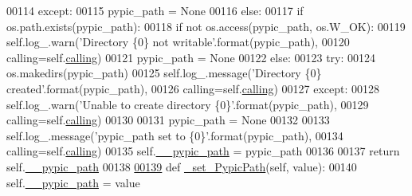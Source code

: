 \begin{DoxyCode}
00114                     \textcolor{keywordflow}{except}:
00115                         pypic\_path = \textcolor{keywordtype}{None}
00116         \textcolor{keywordflow}{else}:
00117             \textcolor{keywordflow}{if} os.path.exists(pypic\_path):
00118                 \textcolor{keywordflow}{if} \textcolor{keywordflow}{not} os.access(pypic\_path, os.W\_OK):
00119                     self.log\_.warn(\textcolor{stringliteral}{'Directory \{0\} not writable'}.format(pypic\_path),
00120                                       calling=self.\hyperlink{classpyneb_1_1utils_1_1_config_1_1___config_abf04542e5670abea107260ca7a6baf6d}{calling})
00121                     pypic\_path = \textcolor{keywordtype}{None}
00122             \textcolor{keywordflow}{else}:
00123                 \textcolor{keywordflow}{try}:
00124                     os.makedirs(pypic\_path)
00125                     self.log\_.message(\textcolor{stringliteral}{'Directory \{0\} created'}.format(pypic\_path),
00126                                       calling=self.\hyperlink{classpyneb_1_1utils_1_1_config_1_1___config_abf04542e5670abea107260ca7a6baf6d}{calling})
00127                 \textcolor{keywordflow}{except}:
00128                     self.log\_.warn(\textcolor{stringliteral}{'Unable to create directory \{0\}'}.format(pypic\_path),
00129                                       calling=self.\hyperlink{classpyneb_1_1utils_1_1_config_1_1___config_abf04542e5670abea107260ca7a6baf6d}{calling})
00130                     
00131                     pypic\_path = \textcolor{keywordtype}{None}
00132             
00133         self.log\_.message(\textcolor{stringliteral}{'pypic\_path set to \{0\}'}.format(pypic\_path),
00134                                           calling=self.\hyperlink{classpyneb_1_1utils_1_1_config_1_1___config_abf04542e5670abea107260ca7a6baf6d}{calling})
00135         self.\hyperlink{classpyneb_1_1utils_1_1_config_1_1___config_a1c122165aa8885ce11f9bf86d08c40cd}{\_\_pypic\_path} = pypic\_path
00136         
00137         \textcolor{keywordflow}{return} self.\hyperlink{classpyneb_1_1utils_1_1_config_1_1___config_a1c122165aa8885ce11f9bf86d08c40cd}{\_\_pypic\_path}
00138     
\hypertarget{_config_8py_source_l00139}{}\hyperlink{classpyneb_1_1utils_1_1_config_1_1___config_a6d13ed9c4ac0d9fee12cc38de10fe9d2}{00139}     \textcolor{keyword}{def }\hyperlink{classpyneb_1_1utils_1_1_config_1_1___config_a6d13ed9c4ac0d9fee12cc38de10fe9d2}{\_set\_PypicPath}(self, value):            
00140         self.\hyperlink{classpyneb_1_1utils_1_1_config_1_1___config_a1c122165aa8885ce11f9bf86d08c40cd}{\_\_pypic\_path} = value

\end{DoxyCode}
